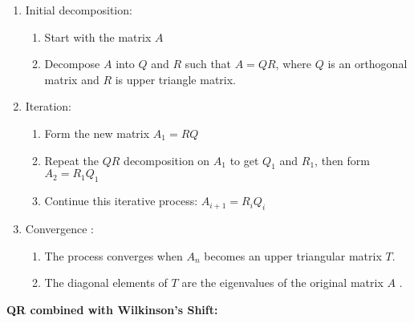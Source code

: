 \documentclass[journal]{IEEEtran}
\begin{document}
\begin{enumerate}
    \item Initial decomposition:
    \begin{enumerate}[label=\textbullet]
        \item Start with the matrix $A$
        \item Decompose $A$ into $Q$ and $R$ such that $A = QR$, where $Q$ is an orthogonal matrix and $R$ is upper triangle matrix.
    \end{enumerate}
    \item Iteration:
    \begin{enumerate}[label=\textbullet]
        \item Form the new matrix $A_1 = RQ$
        \item Repeat the $QR$ decomposition on $A_1$ to get $Q_1$ and $R_1$, then form $A_2 = R_1Q_1$
        \item Continue this iterative process: $A_{i+1} = R_iQ_i$
    \end{enumerate}
    \item Convergence :
    \begin{enumerate}[label=\textbullet]
        \item The process converges when $A_n$ becomes an upper triangular matrix $T$. 
        \item The diagonal elements of 
$T$
 are the eigenvalues of the original matrix 
$A$
.
    \end{enumerate}
\end{enumerate}
\textbf{QR combined with Wilkinson's Shift:}\\
\end{document}
